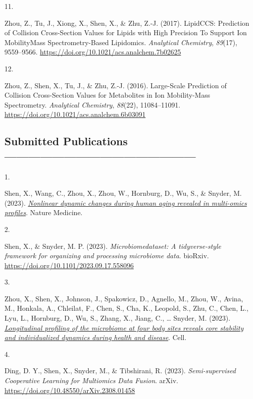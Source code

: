 \documentclass[11pt,a4paper,]{moderncv}
\newlength{\csllabelwidth}
\newcommand{\CSLLeftMargin}[1]{\parbox[t]{\csllabelwidth}{#1}}
\newcommand{\CSLRightInline}[1]{\parbox[t]{\linewidth - \csllabelwidth}{#1}}
\begin{document}
\leavevmode{}%
\CSLLeftMargin{11. }%
\CSLRightInline{Zhou, Z., Tu, J., Xiong, X., Shen, X., \& Zhu, Z.-J.
(2017). LipidCCS: Prediction of Collision Cross-Section Values for
Lipids with High Precision To Support Ion MobilityMass
Spectrometry-Based Lipidomics. \emph{Analytical Chemistry},
\emph{89}(17), 9559--9566.
\url{https://doi.org/10.1021/acs.analchem.7b02625}}

\leavevmode{}%
\CSLLeftMargin{12. }%
\CSLRightInline{Zhou, Z., Shen, X., Tu, J., \& Zhu, Z.-J. (2016).
Large-Scale Prediction of Collision Cross-Section Values for Metabolites
in Ion Mobility-Mass Spectrometry. \emph{Analytical Chemistry},
\emph{88}(22), 11084--11091.
\url{https://doi.org/10.1021/acs.analchem.6b03091}}

\hypertarget{submitted-publications}{%
\subsection{Submitted
Publications------------------------------------------------}\label{submitted-publications}}

\hypertarget{bibliography}{}
\leavevmode{}%
\CSLLeftMargin{1. }%
\CSLRightInline{Shen, X., Wang, C., Zhou, X., Zhou, W., Hornburg, D.,
Wu, S., \& Snyder, M. (2023). \emph{\href{}{Nonlinear dynamic changes
during human aging revealed in multi-omics profiles}}. Nature Medicine.}

\leavevmode{}%
\CSLLeftMargin{2. }%
\CSLRightInline{Shen, X., \& Snyder, M. P. (2023).
\emph{Microbiomedataset: A tidyverse-style framework for organizing and
processing microbiome data}. bioRxiv.
\url{https://doi.org/10.1101/2023.09.17.558096}}

\leavevmode{}%
\CSLLeftMargin{3. }%
\CSLRightInline{Zhou, X., Shen, X., Johnson, J., Spakowicz, D., Agnello,
M., Zhou, W., Avina, M., Honkala, A., Chleilat, F., Chen, S., Cha, K.,
Leopold, S., Zhu, C., Chen, L., Lyu, L., Hornburg, D., Wu, S., Zhang,
X., Jiang, C., \ldots{} Snyder, M. (2023). \emph{\href{}{Longitudinal
profiling of the microbiome at four body sites reveals core stability
and individualized dynamics during health and disease}}. Cell.}

\leavevmode{}%
\CSLLeftMargin{4. }%
\CSLRightInline{Ding, D. Y., Shen, X., Snyder, M., \& Tibshirani, R.
(2023). \emph{Semi-supervised Cooperative Learning for Multiomics Data
Fusion}. arXiv. \url{https://doi.org/10.48550/arXiv.2308.01458}}
\end{document}
